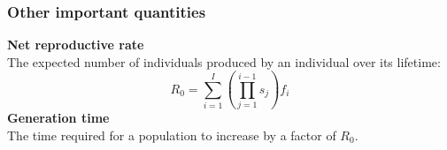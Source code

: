 \documentclass[color=usenames,dvipsnames]{beamer}\usepackage[]{graphicx}\usepackage[]{xcolor}
\begin{document}












\begin{frame}
  \frametitle{Other important quantities}
  {\bf Net reproductive rate \\}
  The expected number of individuals produced by an individual over
  its lifetime: \\
  \[
    R_0 = \sum_{i=1}^I \left(\prod_{j=1}^{i-1} s_j\right)f_i
  \]
  \pause
  \vfill
  {\bf Generation time \\}
  The time required for a population to increase by a factor of $R_0$.
\end{frame}





\end{document}
